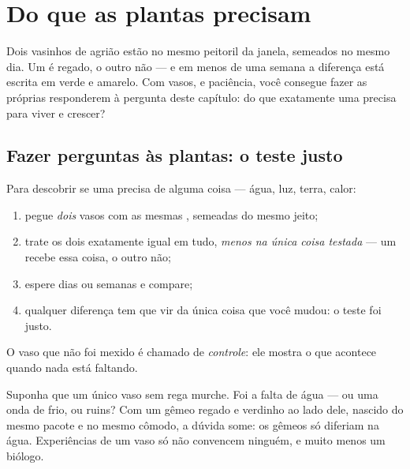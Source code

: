 \chapter{Do que as plantas precisam}\label{ch:g4:what-plants-need}

Dois vasinhos de agrião estão no mesmo peitoril da janela, semeados
no mesmo dia. Um é regado, o outro não --- e em menos de uma semana
a diferença está escrita em verde e amarelo. Com vasos,  e
paciência, você consegue fazer as próprias  responderem à
pergunta deste capítulo: do que exatamente uma  precisa para
viver e crescer?

\section{Fazer perguntas às plantas: o teste justo}

\begin{method}\label{met:g4:what-plants-need:fairtest}
Para descobrir se uma  precisa de alguma coisa --- água, luz,
terra, calor:
\begin{enumerate}
  \item pegue \emph{dois} vasos com as mesmas , semeadas do
        mesmo jeito;
  \item trate os dois exatamente igual em tudo, \emph{menos na única
        coisa testada} --- um recebe essa coisa, o outro não;
  \item espere dias ou semanas e compare;
  \item qualquer diferença tem que vir da única coisa que você
        mudou: o teste foi justo.
\end{enumerate}
O vaso que não foi mexido é chamado de \emph{controle}: ele mostra o que acontece quando nada está faltando.
\end{method}

\begin{example}\label{ex:g4:what-plants-need:control}
Suponha que um único vaso sem rega murche. Foi a falta de água ---
ou uma onda de frio, ou  ruins? Com um gêmeo regado e
verdinho ao lado dele, nascido do mesmo pacote e no mesmo cômodo, a
dúvida some: os gêmeos só diferiam na água. Experiências de um vaso
só não convencem ninguém, e muito menos um biólogo.
\end{example}



